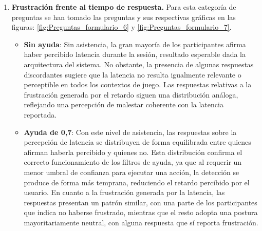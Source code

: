 \begin{enumerate}
\begin{itemize}
                  \item \textbf{Ayuda de 0,7}: Con este nivel de asistencia, los
                        resultados mejoran respecto al nivel anterior en ambas clases. Las respuestas
                        relativas a la mano derecha se mantienen favorables, mientras que las
                        correspondientes a la mano izquierda experimentan una mejora notable,
                        desplazándose hacia valoraciones más positivas en cuanto a la correcta
                        detección y clasificación de dicha clase.

                  \item \textbf{Ayuda de 1}: Con asistencia total, la percepción de
                        control mediante la mano derecha sigue siendo en general favorable, aunque
                        aparecen algunas respuestas discordantes. Esta discrepancia puede atribuirse
                        a que, si bien el sistema selecciona la acción más beneficiosa para el
                        desarrollo de la partida, dicha acción no siempre coincide con la intención
                        o estrategia del usuario. Un comportamiento análogo se observa en las
                        respuestas relativas a la mano izquierda, donde la tendencia general es
                        favorable pero persiste cierta discrepancia, probablemente por la misma razón.
            \end{itemize}
      \item \textbf{Frustración frente al tiempo de respuesta.} Para esta categoría de preguntas se han tomado las preguntas y sus respectivas gráficas en las figuras: \ref{fig:Preguntas_formulario_6} y \ref{fig:Preguntas_formulario_7}.
            \begin{itemize}
                  \item \textbf{Sin ayuda}: Sin asistencia, la gran mayoría de los 
    participantes afirma haber percibido latencia durante la sesión, resultado 
    esperable dada la arquitectura del sistema. No obstante, la presencia de 
    algunas respuestas discordantes sugiere que la latencia no resulta igualmente 
    relevante o perceptible en todos los contextos de juego. Las respuestas 
    relativas a la frustración generada por el retardo siguen una distribución 
    análoga, reflejando una percepción de malestar coherente con la latencia 
    reportada.
                  \item \textbf{Ayuda de 0,7}: Con este nivel de asistencia, las 
    respuestas sobre la percepción de latencia se distribuyen de forma equilibrada 
    entre quienes afirman haberla percibido y quienes no. Esta distribución 
    confirma el correcto funcionamiento de los filtros de ayuda, ya que al 
    requerir un menor umbral de confianza para ejecutar una acción, la detección 
    se produce de forma más temprana, reduciendo el retardo percibido por el 
    usuario. En cuanto a la frustración generada por la latencia, las respuestas 
    presentan un patrón similar, con una parte de los participantes que indica 
    no haberse frustrado, mientras que el resto adopta una postura mayoritariamente 
    neutral, con alguna respuesta que sí reporta frustración.


\end{itemize}
\end{enumerate}
